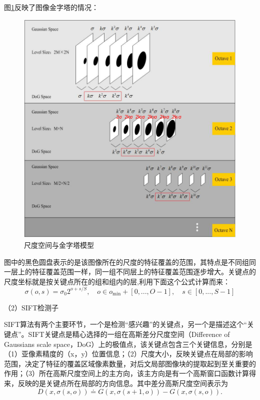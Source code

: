 图\ref{fig:DoG}反映了图像金字塔的情况：
\begin{figure}
\centering\includegraphics[width=15cm]{imgs/ch2/DoG}
\caption{尺度空间与金字塔模型}
\label{fig:DoG}
\end{figure}

图中的黑色圆盘表示的是该图像所在的尺度的特征覆盖的范围，其特点是不同组同一层上的特征覆盖范围一样，同一组不同层上的特征覆盖范围逐步增大。关键点的尺度坐标就是按关键点所在的组和组内的层,利用下面这个公式计算而来：
\begin{equation}
  \sigma(o,s) = \sigma_0 2^{o+s/S},
  \quad o \in o_{\min} + [0, ..., O-1],
  \quad s \in [0,...,S-1]
\end{equation}

（2）SIFT检测子

SIFT算法有两个主要环节，一个是检测“感兴趣”的关键点，另一个是描述这个“关键点”。SIFT关键点是精心选择的一组在高斯差分尺度空间（Difference of Gaussians scale space，DoG）上的极值点，该关键点包含三个关键信息，分别是（1）亚像素精度的（x，y）位置信息；（2）尺度大小，反映关键点在局部的影响范围，决定了特征的覆盖区域像素数量，对后文局部图像块的提取起到至关重要的作用；（3）所在高斯尺度空间上的主方向，该主方向是有一个高斯窗口函数计算得来，反映的是关键点所在局部的方向信息。其中差分高斯尺度空间表示为
\begin{equation}
  D(x,\sigma(s,o)) \doteq G(x,\sigma(s+1,o)) - G(x,\sigma(s,o)).
\end{equation}

